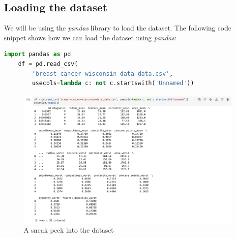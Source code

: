 \subsection{Loading the dataset}
We will be using the \textit{pandas} library to load the dataset. The following code snippet shows how we can load the dataset using \textit{pandas}:
\begin{lstlisting}[language=Python]
    import pandas as pd
    df = pd.read_csv(
        'breast-cancer-wisconsin-data_data.csv', 
        usecols=lambda c: not c.startswith('Unnamed'))
\end{lstlisting}
\begin{figure}[h]
    \centering
    \includegraphics[width=15cm]{ch/figures/sneak-peek-into-dataset.png}
    \caption{A sneak peek into the dataset}
    \label{fig:sneak-peek-into-dataset}
\end{figure}
